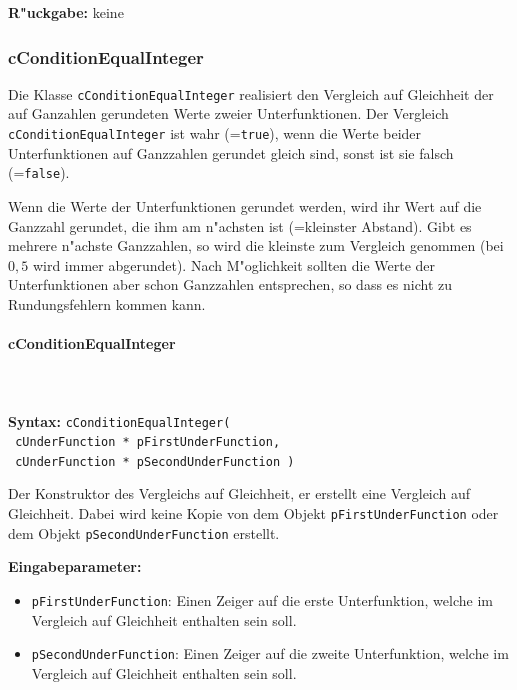 \bigskip\noindent
\textbf{R"uckgabe:} keine


\subsubsection{cConditionEqualInteger}

Die Klasse \verb|cConditionEqualInteger| realisiert den Vergleich auf Gleichheit der auf Ganzahlen gerundeten Werte zweier Unterfunktionen. Der Vergleich \verb|cConditionEqualInteger| ist wahr (=\verb|true|), wenn die Werte beider Unterfunktionen auf Ganzzahlen gerundet gleich sind, sonst ist sie falsch  (=\verb|false|).

Wenn die Werte der Unterfunktionen gerundet werden, wird ihr Wert auf die Ganzzahl gerundet, die ihm am n"achsten ist (=kleinster Abstand). Gibt es mehrere n"achste Ganzzahlen, so wird die kleinste zum Vergleich genommen (bei $0,5$ wird immer abgerundet). Nach M"oglichkeit sollten die Werte der Unterfunktionen aber schon Ganzzahlen entsprechen, so dass es nicht zu Rundungsfehlern kommen kann.


\paragraph{cConditionEqualInteger}

\ \\\\\noindent
\textbf{Syntax:} \verb|cConditionEqualInteger(| \\\verb| cUnderFunction * pFirstUnderFunction,| \\\verb| cUnderFunction * pSecondUnderFunction )|

\bigskip\noindent
Der Konstruktor des Vergleichs auf Gleichheit, er erstellt eine Vergleich auf Gleichheit. Dabei wird keine Kopie von dem Objekt \verb|pFirstUnderFunction| oder dem Objekt \verb|pSecondUnderFunction| erstellt.

\bigskip\noindent
\textbf{Eingabeparameter:}
\begin{itemize}
 \item \verb|pFirstUnderFunction|: Einen Zeiger auf die erste Unterfunktion, welche im Vergleich auf Gleichheit enthalten sein soll.
 \item \verb|pSecondUnderFunction|: Einen Zeiger auf die zweite Unterfunktion, welche im Vergleich auf Gleichheit enthalten sein soll.
\end{itemize}

